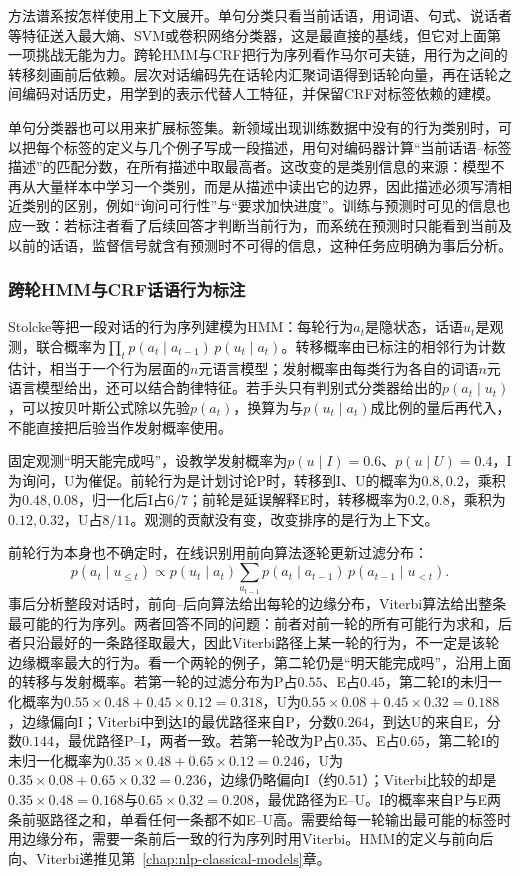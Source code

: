 方法谱系按怎样使用上下文展开。单句分类只看当前话语，用词语、句式、说话者等特征送入最大熵、SVM或卷积网络分类器，这是最直接的基线，但它对上面第一项挑战无能为力。跨轮HMM与CRF把行为序列看作马尔可夫链，用行为之间的转移刻画前后依赖。层次对话编码先在话轮内汇聚词语得到话轮向量，再在话轮之间编码对话历史，用学到的表示代替人工特征，并保留CRF对标签依赖的建模。

单句分类器也可以用来扩展标签集。新领域出现训练数据中没有的行为类别时，可以把每个标签的定义与几个例子写成一段描述，用句对编码器计算“当前话语--标签描述”的匹配分数，在所有描述中取最高者。这改变的是类别信息的来源：模型不再从大量样本中学习一个类别，而是从描述中读出它的边界，因此描述必须写清相近类别的区别，例如“询问可行性”与“要求加快进度”。训练与预测时可见的信息也应一致：若标注者看了后续回答才判断当前行为，而系统在预测时只能看到当前及以前的话语，监督信号就含有预测时不可得的信息，这种任务应明确为事后分析。

\subsubsection{跨轮HMM与CRF话语行为标注}
\label{sec:nlp-analysis-dialogue-sequence}

Stolcke等把一段对话的行为序列建模为HMM：每轮行为$a_t$是隐状态，话语$u_t$是观测，联合概率为$\prod_t p(a_t\mid a_{t-1})\,p(u_t\mid a_t)$。转移概率由已标注的相邻行为计数估计，相当于一个行为层面的$n$元语言模型；发射概率由每类行为各自的词语$n$元语言模型给出，还可以结合韵律特征。若手头只有判别式分类器给出的$p(a_t\mid u_t)$，可以按贝叶斯公式除以先验$p(a_t)$，换算为与$p(u_t\mid a_t)$成比例的量后再代入，不能直接把后验当作发射概率使用。

固定观测“明天能完成吗”，设教学发射概率为$p(u\mid I)=0.6$、$p(u\mid U)=0.4$，I为询问，U为催促。前轮行为是计划讨论P时，转移到I、U的概率为$0.8,0.2$，乘积为$0.48,0.08$，归一化后I占$6/7$；前轮是延误解释E时，转移概率为$0.2,0.8$，乘积为$0.12,0.32$，U占$8/11$。观测的贡献没有变，改变排序的是行为上下文。

前轮行为本身也不确定时，在线识别用前向算法逐轮更新过滤分布：
\[
  p(a_t\mid u_{\leq t})\propto p(u_t\mid a_t)\sum_{a_{t-1}}p(a_t\mid a_{t-1})\,p(a_{t-1}\mid u_{<t}).
\]
事后分析整段对话时，前向--后向算法给出每轮的边缘分布，Viterbi算法给出整条最可能的行为序列。两者回答不同的问题：前者对前一轮的所有可能行为求和，后者只沿最好的一条路径取最大，因此Viterbi路径上某一轮的行为，不一定是该轮边缘概率最大的行为。看一个两轮的例子，第二轮仍是“明天能完成吗”，沿用上面的转移与发射概率。若第一轮的过滤分布为P占$0.55$、E占$0.45$，第二轮I的未归一化概率为$0.55\times0.48+0.45\times0.12=0.318$，U为$0.55\times0.08+0.45\times0.32=0.188$，边缘偏向I；Viterbi中到达I的最优路径来自P，分数$0.264$，到达U的来自E，分数$0.144$，最优路径P--I，两者一致。若第一轮改为P占$0.35$、E占$0.65$，第二轮I的未归一化概率为$0.35\times0.48+0.65\times0.12=0.246$，U为$0.35\times0.08+0.65\times0.32=0.236$，边缘仍略偏向I（约$0.51$）；Viterbi比较的却是$0.35\times0.48=0.168$与$0.65\times0.32=0.208$，最优路径为E--U。I的概率来自P与E两条前驱路径之和，单看任何一条都不如E--U高。需要给每一轮输出最可能的标签时用边缘分布，需要一条前后一致的行为序列时用Viterbi。HMM的定义与前向后向、Viterbi递推见第~\ref{chap:nlp-classical-models}章。

